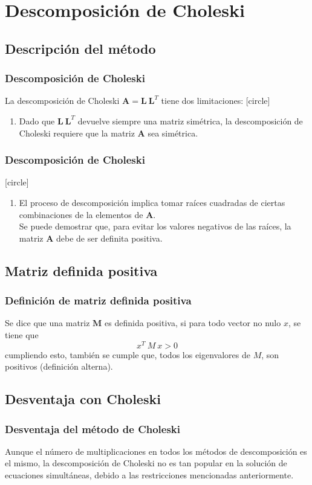 \section{Descomposición de Choleski}
\subsection{Descripción del método}
\begin{frame}
\frametitle{Descomposición de Choleski}
La descomposición de Choleski $\mathbf{A = L \: L}^{T}$ tiene dos limitaciones:
[circle]
\begin{enumerate}[<+->]
\item Dado que $\mathbf{L \: L}^{T}$ devuelve siempre una matriz simétrica, la descomposición de Choleski requiere que la matriz $\mathbf{A}$ sea simétrica.
\seti
\end{enumerate}
\end{frame}
\begin{frame}
\frametitle{Descomposición de Choleski}
[circle]
\begin{enumerate}[<+->]
\conti
\item El proceso de descomposición implica tomar raíces cuadradas de ciertas combinaciones de la elementos de $\mathbf{A}$.
\\
\bigskip
Se puede demostrar que, para evitar los valores negativos de las raíces, la matriz $\mathbf{A}$ debe de ser definita positiva.
\end{enumerate}
\end{frame}
\subsection*{Matriz definida positiva}
\begin{frame}
\frametitle{Definición de matriz definida positiva}
Se dice que una matriz $\mathbf{M}$ es definida positiva, si para todo vector no nulo $x$, se tiene que
\[ x^{T} \: M \: x > 0 \]
cumpliendo esto, también se cumple que, todos los eigenvalores de $M$, son positivos (definición alterna).
\end{frame}
\subsection*{Desventaja con Choleski}
\begin{frame}
\frametitle{Desventaja del método de Choleski}
Aunque el número de multiplicaciones en todos los métodos de descomposición es el mismo, la descomposición de Choleski no es tan popular en la solución de ecuaciones simultáneas, debido a las restricciones mencionadas anteriormente.
\end{frame}
